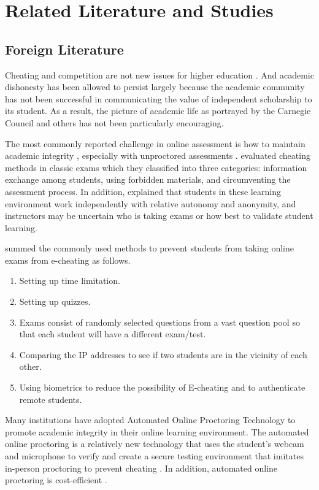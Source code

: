 \chapter{Related Literature and Studies}

\section{Foreign Literature}

Cheating and competition are not new issues for higher education \cite{nuss1984academic}.
And academic dishonesty has been allowed to persist largely because the academic community has not been successful in communicating the value of independent scholarship to its student.
As a result, the picture of academic life as portrayed by the Carnegie Council and others has not been particularly encouraging.

The most commonly reported challenge in online assessment is how to maintain academic integrity \cite{hollister2009proctored}, especially with unproctored assessments \cite{arnold2016cheating}.
 evaluated cheating methods in classic exams which they classified into three categories: information exchange among students, using forbidden materials, and circumventing the assessment process.
In addition,  explained that students in these learning environment work independently with relative autonomy and anonymity, and instructors may be uncertain who is taking exams or how best to validate student learning.

 summed the commonly used methods to prevent students from taking online exams from e-cheating as follows.

\begin{enumerate}
    \item Setting up time limitation.
    \item Setting up quizzes.
    \item Exams consist of randomly selected questions from a vast question pool so that each student will have a different exam/test.
    \item Comparing the IP addresses to see if two students are in the vicinity of each other.
    \item Using biometrics to reduce the possibility of E-cheating and to authenticate remote students.
\end{enumerate}

Many institutions have adopted Automated Online Proctoring Technology to promote academic integrity in their online learning environment.
The automated online proctoring is a relatively new technology that uses the student’s webcam and microphone to verify and create a secure testing environment that imitates in-person proctoring to prevent cheating \cite{karim2014cheating}.
In addition, automated online proctoring is cost-efficient \cite{atoum2017automated,mitra2016biometrics}.

